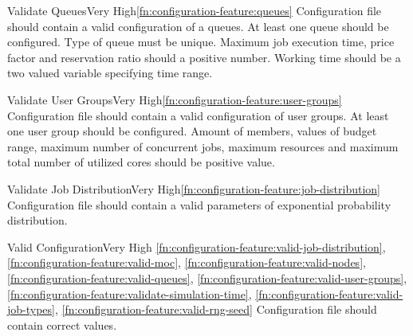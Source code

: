 	\begin{functional}{Validate Queues}{Very High}{\ref{fn:configuration-feature:queues}}
		\label{fn:configuration-feature:valid-queues}
		{
			Configuration file should contain a valid configuration of a queues. At least one queue should be configured.
			Type of queue must be unique. Maximum job execution time, price factor and reservation ratio should a positive number.
			Working time should be a two valued variable specifying time range.
		}
	\end{functional}

	\begin{functional}{Validate User Groups}{Very High}{\ref{fn:configuration-feature:user-groups}}
		\label{fn:configuration-feature:valid-user-groups}
		{
			Configuration file should contain a valid configuration of user groups. At least one user group should be configured. Amount of members, values of budget range, maximum number of concurrent jobs, maximum resources and maximum total number of utilized cores should be positive value.
		}
	\end{functional}

	\begin{functional}{Validate Job Distribution}{Very High}{\ref{fn:configuration-feature:job-distribution}}
		\label{fn:configuration-feature:valid-job-distribution}
		{
			Configuration file should contain a valid parameters of exponential probability distribution.	
		}
	\end{functional}

	\begin{functional}{Valid Configuration}{Very High}
		{
			\ref{fn:configuration-feature:valid-job-distribution},
			\ref{fn:configuration-feature:valid-moc},
			\ref{fn:configuration-feature:valid-nodes},
			\ref{fn:configuration-feature:valid-queues},
			\ref{fn:configuration-feature:valid-user-groups},
			\ref{fn:configuration-feature:validate-simulation-time},
			\ref{fn:configuration-feature:valid-job-types},
			\ref{fn:configuration-feature:valid-rng-seed}
		}
		\label{fn:configuration-feature:valid-configuration}
		{
			Configuration file should contain correct values.
		}
	\end{functional}
	